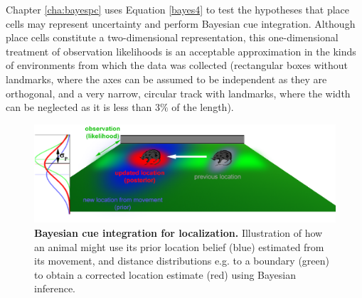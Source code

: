 Chapter \ref{cha:bayespc} uses Equation \ref{bayes4} to test the hypotheses that place cells may represent uncertainty and perform Bayesian cue integration. Although place cells constitute a two-dimensional representation, this one-dimensional treatment of observation likelihoods is an acceptable approximation in the kinds of environments from which the data was collected (rectangular boxes without landmarks, where the axes can be assumed to be independent as they are orthogonal, and a very narrow, circular track with landmarks, where the width can be neglected as it is less than $3\%$ of the length). 





\begin{figure}[h]
	\centering
	\includegraphics[width=\textwidth]{img/bayesian_localization3}
	\caption[Bayesian cue integration for localization]{\textbf{Bayesian cue integration for localization.} Illustration of how an animal might use its prior location belief (blue) estimated from its movement, and distance distributions e.g. to a boundary (green) to obtain a corrected location estimate (red) using Bayesian inference.} 
	\label{fig:bayescue} 
\end{figure}

